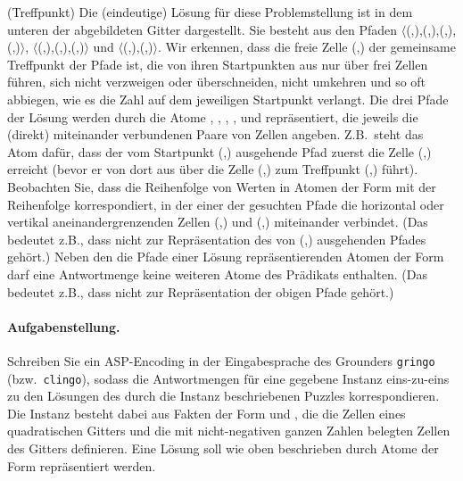 \documentclass[a4paper,12pt,ngerman]{article}
\begin{document}
\begin{PraktikumsAufgabe}{1}{(Treffpunkt)}
\noindent
Die (eindeutige) Lösung für diese Problemstellung ist in dem unteren der abgebildeten Gitter dargestellt.
Sie besteht aus den Pfaden
$\langle$(,),(,),(,),(,)$\rangle$,
$\langle$(,),(,),(,)$\rangle$
und
$\langle$(,),(,)$\rangle$.
Wir erkennen, dass die freie Zelle (,) der gemeinsame Treffpunkt der Pfade ist, die von ihren Startpunkten aus nur über frei Zellen führen, sich nicht verzweigen oder überschneiden, nicht umkehren und so oft abbiegen, wie es die Zahl auf dem jeweiligen Startpunkt verlangt.
Die drei Pfade der Lösung werden durch die Atome
, , ,
,  und 
repräsentiert, die jeweils die (direkt) miteinander verbundenen Paare von Zellen angeben.
Z.B.\ steht das Atom  dafür, dass der vom Startpunkt (,) ausgehende Pfad zuerst die Zelle (,) erreicht
(bevor er von dort aus über die Zelle (,) zum Treffpunkt (,) führt).
Beobachten Sie, dass die Reihenfolge von Werten in Atomen der Form 
mit der Reihenfolge korrespondiert, in der einer der gesuchten Pfade die horizontal
oder vertikal aneinandergrenzenden Zellen (,) und 
(,) miteinander verbindet.
(Das bedeutet z.B., dass  nicht zur Repräsentation des von (,) ausgehenden Pfades gehört.)
Neben den die Pfade einer Lösung repräsentierenden Atomen der Form 
darf eine Antwortmenge keine weiteren Atome des Pr\"adikats  enthalten.
(Das bedeutet z.B.,  dass  nicht zur Repräsentation der obigen Pfade gehört.)

\paragraph{Aufgabenstellung.}
%
Schreiben Sie ein ASP-Encoding %
in der Eingabesprache des Grounders \texttt{gringo} (bzw.\ \texttt{clingo}),
sodass die Antwortmengen für eine gegebene Instanz
eins-zu-eins zu den Lösungen des durch die Instanz beschriebenen Puzzles korrespondieren.
Die Instanz besteht dabei aus Fakten der Form  und ,
die die Zellen eines quadratischen Gitters und die mit nicht-negativen ganzen Zahlen
belegten Zellen des Gitters definieren.
%
Eine Lösung soll wie oben beschrieben durch Atome der Form
 repräsentiert werden.


\end{PraktikumsAufgabe}
\end{document}
